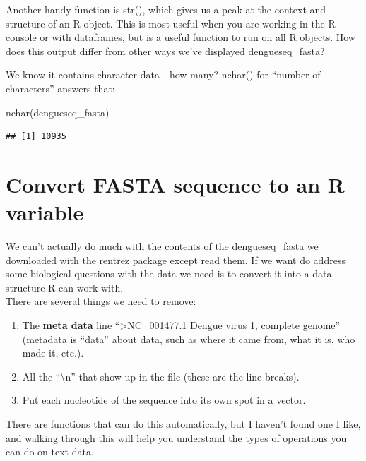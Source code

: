 \documentclass[
]{book}
\newenvironment{Shaded}{\begin{snugshade}}{\end{snugshade}}
\newcommand{\FunctionTok}[1]{\textcolor[rgb]{0.00,0.00,0.00}{#1}}
\newcommand{\NormalTok}[1]{#1}
\providecommand{\tightlist}{%
  \setlength{\itemsep}{0pt}\setlength{\parskip}{0pt}}
\begin{document}
Another handy function is str(), which gives us a peak at the context and structure of an R object. This is most useful when you are working in the R console or with dataframes, but is a useful function to run on all R objects. How does this output differ from other ways we've displayed dengueseq\_fasta?

We know it contains character data - how many? nchar() for ``number of characters'' answers that:

\begin{Shaded}
\begin{Highlighting}[]
\FunctionTok{nchar}\NormalTok{(dengueseq\_fasta)}
\end{Highlighting}
\end{Shaded}

\begin{verbatim}
## [1] 10935
\end{verbatim}

\hypertarget{convert-fasta-sequence-to-an-r-variable}{%
\section{Convert FASTA sequence to an R variable}\label{convert-fasta-sequence-to-an-r-variable}}

We can't actually do much with the contents of the dengueseq\_fasta we downloaded with the rentrez package except read them. If we want do address some biological questions with the data we need is to convert it into a data structure R can work with.\\
There are several things we need to remove:

\begin{enumerate}
\def\labelenumi{\arabic{enumi}.}
\tightlist
\item
  The \textbf{meta data} line ``\textgreater NC\_001477.1 Dengue virus 1, complete genome'' (metadata is ``data'' about data, such as where it came from, what it is, who made it, etc.).
\item
  All the ``\textbackslash n'' that show up in the file (these are the line breaks).
\item
  Put each nucleotide of the sequence into its own spot in a vector.
\end{enumerate}

There are functions that can do this automatically, but I haven't found one I like, and walking through this will help you understand the types of operations you can do on text data.
\end{document}

